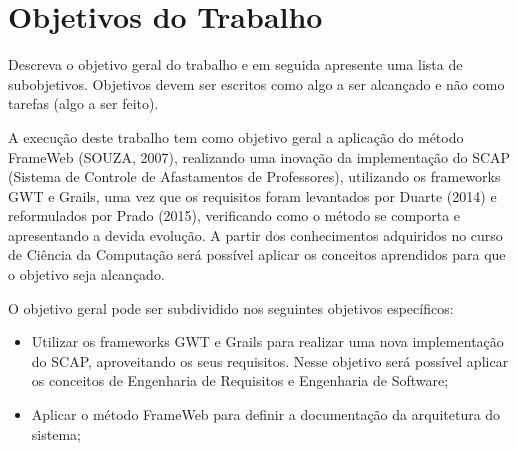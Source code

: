 
\section{Objetivos do Trabalho}
\label{sec-objetivos}

Descreva o objetivo geral do trabalho e em seguida apresente uma lista de subobjetivos. Objetivos devem ser escritos como algo a ser alcançado e não como tarefas (algo a ser feito).

A execução deste trabalho tem como objetivo geral a aplicação do método FrameWeb (SOUZA, 2007), realizando uma inovação da implementação do SCAP (Sistema de Controle de Afastamentos de Professores), utilizando os frameworks GWT e Grails, uma vez que os requisitos foram levantados por Duarte (2014) e reformulados por Prado (2015), verificando como o método se comporta e apresentando a devida evolução. A partir dos conhecimentos adquiridos no curso de Ciência da Computação será possível aplicar os conceitos aprendidos para que o objetivo seja alcançado.

O objetivo geral pode ser subdividido nos seguintes objetivos específicos:

\begin{itemize}
	\item Utilizar os frameworks GWT e Grails para realizar uma nova implementação do SCAP, aproveitando os seus requisitos. Nesse objetivo será possível aplicar os conceitos de Engenharia de Requisitos e Engenharia de Software;
	\item Aplicar o método FrameWeb para definir a documentação da arquitetura do sistema;
\end{itemize}
